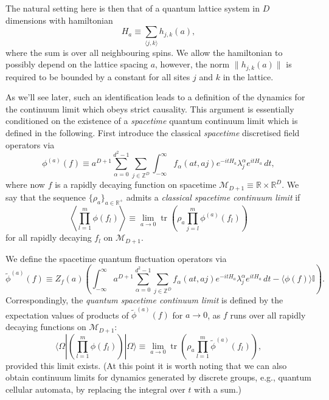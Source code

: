 \documentclass[prl,twocolumn,lengthcheck,superscriptaddress]{revtex4-1}
\newcommand{\tr}{\operatorname{tr}}
\theoremstyle{definition}
\theoremstyle{remark}
\begin{document}
The natural setting here is then that of a quantum lattice system in $D$ dimensions with hamiltonian 
\begin{equation}
	H_a \equiv \sum_{\langle j,k\rangle } h_{j,k}(a),
\end{equation}
where the sum is over all neighbouring spins. We allow the hamiltonian to possibly depend on the lattice spacing $a$, however, the norm $\|h_{j,k}(a)\|$ is required to be bounded by a constant for all sites $j$ and $k$ in the lattice. 

As we'll see later, such an identification leads to a definition of the dynamics for the continuum limit which obeys strict causality. This argument is essentially conditioned on the existence of a \emph{spacetime} quantum continuum limit which is defined in the following. First introduce the classical \emph{spacetime} discretised field operators via
\begin{equation}
	\phi^{(a)}(f) \equiv a^{D+1}\sum_{\alpha = 0}^{d^2-1}\sum_{j\in\mathbb{Z}^D} \int_{-\infty}^\infty f_\alpha(at, aj) e^{-itH_a}\lambda^\alpha_je^{itH_a} \, dt,
\end{equation}
where now $f$ is a rapidly decaying function on spacetime $\mathcal{M}_{D+1}\equiv\mathbb{R}\times \mathbb{R}^D$. We say that the sequence 
$\{\rho_a\}_{a\in\mathbb{R}^+}$ admits a \emph{classical spacetime continuum limit} if 
\begin{equation}
	\left\langle\prod_{l=1}^m\phi(f_l)\right\rangle \equiv \lim_{a\rightarrow 0} \tr\left(\rho_a \prod_{j=l}^m\phi^{(a)}(f_l)\right)
\end{equation}
for all rapidly decaying $f_l$ on $\mathcal{M}_{D+1}$.

We define the spacetime quantum fluctuation operators via
\begin{equation}
	\widetilde{\phi}^{(a)}(f) \equiv Z_f(a)\left( \int_{-\infty}^\infty  a^{D+1}\sum_{\alpha = 0}^{d^2-1}\sum_{j\in \mathbb{Z}^D} f_\alpha(at, aj) e^{-itH_a}\lambda^\alpha_je^{itH_a} \,dt - \langle\phi(f)\rangle\mathbb{I}\right).
\end{equation}
Correspondingly, the \emph{quantum spacetime continuum limit} is defined by the expectation values of products of $\widetilde{\phi}^{(a)}(f)$ for $a\rightarrow 0$, as $f$ runs over all rapidly decaying functions on $\mathcal{M}_{D+1}$:
\begin{equation}\label{eq:qsctslimit}
	\langle\Omega|\left(\prod_{l=1}^m\widehat{\phi}(f_l)\right)|\Omega\rangle \equiv \lim_{a\rightarrow 0} \tr\left(\rho_a \prod_{l=1}^m\widetilde{\phi}^{(a)}(f_l)\right),
\end{equation}
provided this limit exists.
(At this point it is worth noting that we can also obtain continuum limits for dynamics generated by discrete groups, e.g., quantum cellular automata, by replacing the integral over $t$ with a sum.)
\end{document}
